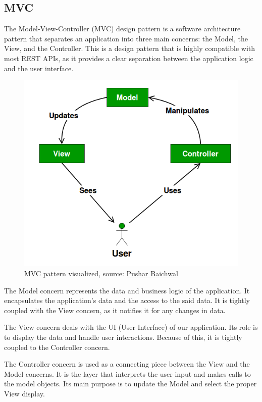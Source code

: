 \subsection{MVC}
The Model-View-Controller (MVC) design pattern is a software architecture pattern that separates an application into three main concerns: 
the Model, the View, and the Controller.
This is a design pattern that is highly compatible with most REST APIs, as it provides a clear separation between the application logic and the user interface.
\begin{figure}[htbp]
    \centering
    \includegraphics[scale=0.4]{pictures/mvc.png}
    \caption{MVC pattern visualized, source: \href{https://pushkarbaichwal7937.medium.com/model-view-controller-in-java-e57b1f754c9e}{Pushar Baichwal}}
    \label{mvcExample}
\end{figure}
\par
The Model concern represents the data and business logic of the application.
It encapsulates the application's data and the access to the said data.
It is tightly coupled with the View concern, as it notifies it for any changes in data.
\par
The View concern deals with the UI (User Interface) of our application.
Its role is to display the data and handle user interactions.
Because of this, it is tightly coupled to the Controller concern.
\par
The Controller concern is used as a connecting piece between the View and the Model concerns.
It is the layer that interprets the user input and makes calls to the model objects.
Its main purpose is to update the Model and select the proper View display.



